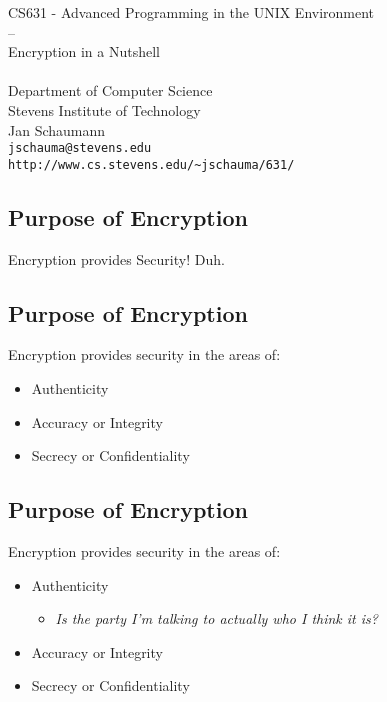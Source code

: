 \documentclass[xga]{xdvislides}
\begin{document}
\setfontphv

\lhead{\slidetitle}
\cfoot{\relax}
\rfoot{\Gray{\today}}

\vspace*{\fill}
\begin{center}
	\Hugesize
		CS631 - Advanced Programming in the UNIX Environment\\
		-- \\
		Encryption in a Nutshell \\
	\hspace*{5mm}\blueline\\ [1em]
	\Normalsize
		Department of Computer Science\\
		Stevens Institute of Technology\\
		Jan Schaumann\\
		\verb+jschauma@stevens.edu+\\
		\verb+http://www.cs.stevens.edu/~jschauma/631/+
\end{center}
\vspace*{\fill}

\subsection{Purpose of Encryption}
\begin{center}
\Hugesize
\vspace*{\fill}
Encryption provides Security! Duh.
\vspace*{\fill}
\Normalsize
\end{center}


\subsection{Purpose of Encryption}
Encryption provides security in the areas of:
\begin{itemize}
	\item Authenticity
	\item Accuracy or Integrity
	\item Secrecy or Confidentiality
\end{itemize}

\subsection{Purpose of Encryption}
Encryption provides security in the areas of:
\begin{itemize}
	\item Authenticity
		\begin{itemize}
			\item {\em Is the party I'm talking to actually who I {\em think} it is?}
		\end{itemize}
	\item Accuracy or Integrity
	\item Secrecy or Confidentiality
\end{itemize}
\end{document}
